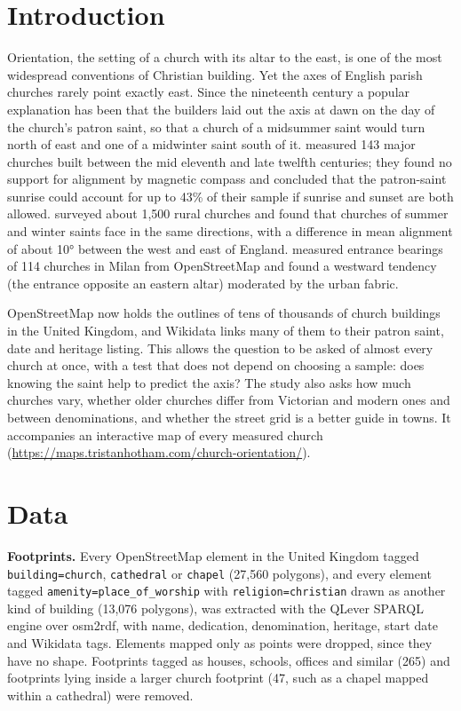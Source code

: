 \documentclass[11pt,a4paper]{article}
\begin{document}
\section{Introduction}
Orientation, the setting of a church with its altar to the east, is one of the most widespread conventions of Christian building. Yet the axes of English parish churches rarely point exactly east. Since the nineteenth century a popular explanation has been that the builders laid out the axis at dawn on the day of the church's patron saint, so that a church of a midsummer saint would turn north of east and one of a midwinter saint south of it. \citet{alicunich} measured 143 major churches built between the mid eleventh and late twelfth centuries; they found no support for alignment by magnetic compass and concluded that the patron-saint sunrise could account for up to 43\% of their sample if sunrise and sunset are both allowed. \citet{hinton} surveyed about 1,500 rural churches and found that churches of summer and winter saints face in the same directions, with a difference in mean alignment of about 10° between the west and east of England. \citet{furuhashi} measured entrance bearings of 114 churches in Milan from OpenStreetMap and found a westward tendency (the entrance opposite an eastern altar) moderated by the urban fabric.

OpenStreetMap now holds the outlines of tens of thousands of church buildings in the United Kingdom, and Wikidata links many of them to their patron saint, date and heritage listing. This allows the question to be asked of almost every church at once, with a test that does not depend on choosing a sample: does knowing the saint help to predict the axis? The study also asks how much churches vary, whether older churches differ from Victorian and modern ones and between denominations, and whether the street grid is a better guide in towns. It accompanies an interactive map of every measured church (\url{https://maps.tristanhotham.com/church-orientation/}).

\section{Data}
\textbf{Footprints.} Every OpenStreetMap \citep{osm} element in the United Kingdom tagged \texttt{building=church}, \texttt{cathedral} or \texttt{chapel} (27,560 polygons), and every element tagged \texttt{amenity=place\_of\_worship} with \texttt{religion=christian} drawn as another kind of building (13,076 polygons), was extracted with the QLever SPARQL engine \citep{qlever} over osm2rdf, with name, dedication, denomination, heritage, start date and Wikidata tags. Elements mapped only as points were dropped, since they have no shape. Footprints tagged as houses, schools, offices and similar (265) and footprints lying inside a larger church footprint (47, such as a chapel mapped within a cathedral) were removed.
\end{document}
